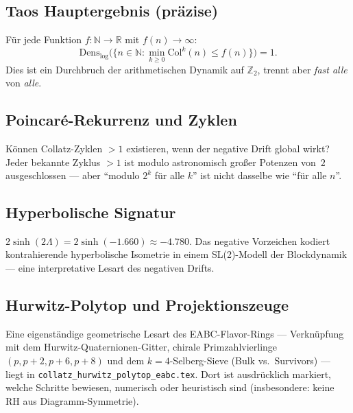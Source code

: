 \documentclass[12pt,a4paper]{article}
\newcommand{\N}{\mathbb{N}}
\newcommand{\R}{\mathbb{R}}
\newcommand{\Ztwo}{\mathbb{Z}_2}
\newcommand{\col}{\mathrm{Col}}
\newcommand{\Lam}{\Lambda}
\begin{document}
\subsection{Taos Hauptergebnis (präzise)}

Für jede Funktion $f:\N\to\R$ mit $f(n)\to\infty$:
\[
  \mathrm{Dens}_{\log}\bigl(\{n\in\N : \min_{k\geq 0}\col^k(n)\leq f(n)\}\bigr)=1.
\]
Dies ist ein Durchbruch der arithmetischen Dynamik auf $\Ztwo$, trennt
aber \emph{fast alle} von \emph{alle}.

\subsection{Poincaré-Rekurrenz und Zyklen}

Können Collatz-Zyklen $>1$ existieren, wenn der negative Drift global
wirkt? Jeder bekannte Zyklus $>1$ ist modulo astronomisch großer Potenzen
von~$2$ ausgeschlossen --- aber ``modulo $2^k$ für alle $k$'' ist nicht
dasselbe wie ``für alle $n$''.

\subsection{Hyperbolische Signatur}

$2\sinh(2\Lam) = 2\sinh(-1.660) \approx -4.780$. Das negative Vorzeichen
kodiert kontrahierende hyperbolische Isometrie in einem SL(2)-Modell der
Blockdynamik --- eine interpretative Lesart des negativen Drifts.

\subsection{Hurwitz-Polytop und Projektionszeuge}

Eine eigenständige geometrische Lesart des EABC-Flavor-Rings --- Verknüpfung
mit dem Hurwitz-Quaternionen-Gitter, chirale Primzahlvierlinge
$(p,p+2,p+6,p+8)$ und dem $k=4$-Selberg-Sieve (Bulk vs.\ Survivors) ---
liegt in \texttt{collatz\_hurwitz\_polytop\_eabc.tex}.
Dort ist ausdrücklich markiert, welche Schritte bewiesen, numerisch oder
heuristisch sind (insbesondere: keine RH aus Diagramm-Symmetrie).
\end{document}

